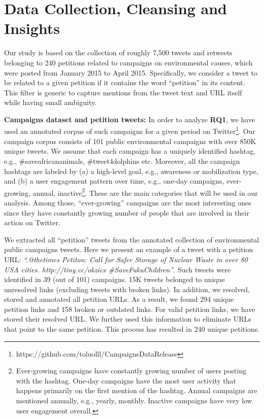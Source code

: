 \section{Data Collection, Cleansing and Insights}
\label{sec:dataset}

Our study is based on the collection of roughly 7,500 tweets and retweets belonging to 240 petitions related to campaigns on environmental causes, which were posted from January 2015 to April 2015. Specifically, we consider a tweet to be related to a given petition if it contains the word ``petition'' in its content. This filter is generic to capture mentions from the tweet text and URL itself while having small ambiguity.

\textbf{Campaigns dataset and petition tweets:}
In order to analyze \textbf{RQ1},
we have used an annotated corpus of such campaigns for a given period on Twitter\footnote{https://github.com/toluolll/CampaignsDataRelease}.
Our campaign corpus consists of 101 public environmental campaigns with over 850K unique tweets. 
We assume that each campaign has a uniquely identified hashtag, e.g., \#saveafricananimals, \#tweet4dolphins etc.
Moreover, all the campaign hashtags are labeled by (a) a high-level goal, e.g., awareness or mobilization type, and (b) a user engagement pattern over time, e.g., one-day campaigns, ever-growing, annual, inactive\footnote{
Ever-growing campaigns have constantly growing number of users posting with the hashtag.
One-day campaigns have the most user activity that happens primarily on the first mention of the hashtag.
Annual campaigns are mentioned annually, e.g., yearly, monthly. Inactive campaigns have very low user engagement overall.}.
These are the main categories that will be used in our analysis.
Among those, ``ever-growing'' campaigns are the most interesting ones since they have constantly growing number of people that are involved in their action on Twitter.

We extracted all ``petition'' tweets from the annotated collection of environmental public campaigns tweets.
Here we present an example of a tweet with a petition URL: \textit{``.@thetimes Petiton: Call for Safer Storage of Nuclear Waste in over 80 USA cities. http://tiny.cc/okzicx  \#SaveFukuChildren''}.
Such tweets were identified in 39 (out of 101) campaigns. 15K tweets belonged to unique unresolved links (excluding tweets with broken links).
In addition, we resolved, stored and annotated all petition URLs. As a result, we found 294 unique petition links and 158 broken or outdated links.
For valid petition links, we have stored their resolved URL. We further used this information to eliminate URLs that point to the same petition.
This process has resulted in 240 unique petitions.

